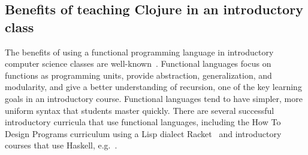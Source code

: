 \documentclass[submission,copyright,creativecommons]{eptcs}
\newcommand{\allcomments}[1]{{#1}}
\newcommand{\elenacomment}[1]{{\bf \textcolor{ForestGreen}{\allcomments{{#1}}}}}
\newcommand{\stephencomment}[1]{{\bf \color{StephensBlue}{\allcomments{{#1}}}}} %
\newcommand{\todo}[1]{{\bf \color{magenta}{\allcomments{ To-do: {#1}}}}}
\begin{document}

\subsection{Benefits of teaching Clojure in an introductory class}
The benefits of using a functional programming language in introductory computer science classes are well-known~\cite{thomsonEducation}. Functional languages focus on functions as programming units, provide abstraction, generalization, and modularity, and give a better understanding of recursion, one of the key learning goals in an introductory course. 
Functional languages tend to have simpler, more uniform syntax that students master quickly. There are several successful introductory curricula that use functional languages, including the How To Design Programs curriculum using a Lisp dialect Racket~\cite{htdp} and introductory courses that use Haskell, e.g.~\cite{haskell}.

\end{document}
